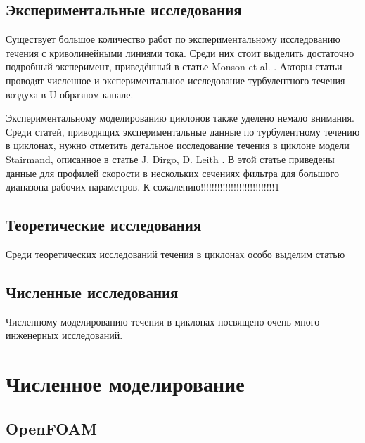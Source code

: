 \documentclass[pdftex,a4paper,12pt]{article}
\begin{document}
	\subsection{Экспериментальные исследования}
		\hspace{2em}Существует большое количество работ по экспериментальному исследованию течения с криволинейными линиями тока. Среди них стоит выделить достаточно подробный эксперимент, приведённый в статье Monson et al. \cite{Monson}. Авторы статьи проводят численное и экспериментальное исследование турбулентного течения воздуха в U-образном канале.
	
		Экспериментальному моделированию циклонов также уделено немало внимания. Среди статей, приводящих экспериментальные данные по турбулентному течению в циклонах, нужно отметить детальное исследование течения в циклоне модели Stairmand, описанное в статье J. Dirgo, D. Leith \cite{DirgoLeith}. В этой статье приведены данные для профилей скорости в нескольких сечениях фильтра для большого диапазона рабочих параметров. К сожалению!!!!!!!!!!!!!!!!!!!!!!!!!!!1
	\subsection{Теоретические исследования}
		\hspace{2em}Среди теоретических исследований течения в циклонах особо выделим статью 
	\subsection{Численные исследования}
		\hspace{2em}Численному моделированию течения в циклонах посвящено очень много инженерных исследований.
\newpage
\section{Численное моделирование}
	\subsection{OpenFOAM}
\end{document}
